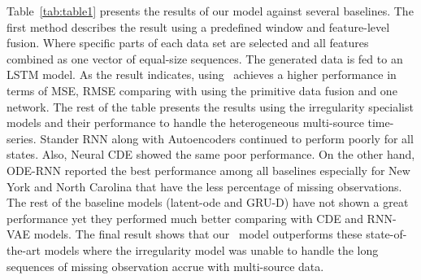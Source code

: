 \documentclass[conference]{IEEEtran}
\begin{document}
Table~\ref{tab:table1} presents the results of our model against several baselines. The first method describes the result using a predefined window and feature-level fusion. Where specific parts of each data set are selected and all features combined as one vector of equal-size sequences. The generated data is fed to an LSTM model. As the result indicates, using  \name\ achieves a higher performance in terms of MSE, RMSE comparing with using the primitive data fusion and one network.
The rest of the table presents the results using the irregularity specialist models and their performance to handle the heterogeneous multi-source time-series. Stander RNN along with Autoencoders continued to perform poorly for all states. Also, Neural CDE showed the same poor performance. On the other hand, ODE-RNN reported the best performance among all baselines especially for New York and North Carolina that have the less percentage of missing observations. The rest of the baseline models (latent-ode and GRU-D) have not shown a great performance yet they performed much better comparing with CDE and RNN-VAE models. The final result shows that our \name\ model outperforms these state-of-the-art models where the irregularity model was unable to handle the long sequences of missing observation accrue with multi-source data. 
\end{document}
